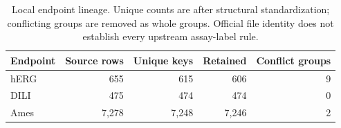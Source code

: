 \begin{table}[t]
\centering
\caption{Local endpoint lineage. Unique counts are after structural standardization; conflicting groups are removed as whole groups. Official file identity does not establish every upstream assay-label rule.}\label{tab:provenance}
\small
\begin{tabular}{lrrrr}
\toprule
Endpoint & Source rows & Unique keys & Retained & Conflict groups\\
\midrule
hERG & 655 & 615 & 606 & 9\\
DILI & 475 & 474 & 474 & 0\\
Ames & 7,278 & 7,248 & 7,246 & 2\\
\bottomrule
\end{tabular}
\end{table}
